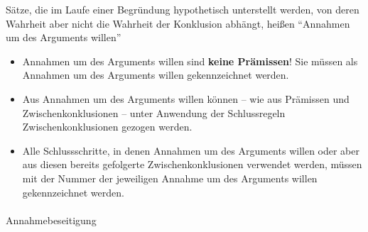 \documentclass[
  english,
  a4paper,
]{article}
\makeatletter
\let\oldparagraph\paragraph
\renewcommand{\paragraph}{
    \@ifstar
      \xxxParagraphStar
      \xxxParagraphNoStar
  }
\newcommand{\xxxParagraphStar}[1]{\oldparagraph*{#1}\mbox{}}
\newcommand{\xxxParagraphNoStar}[1]{\oldparagraph{#1}\mbox{}}
\providecommand{\tightlist}{%
  \setlength{\itemsep}{0pt}\setlength{\parskip}{0pt}}
\makeatother
\begin{document}
\begin{tcolorbox}[enhanced jigsaw, arc=.35mm, bottomrule=.15mm, bottomtitle=1mm, breakable, colback=white, colbacktitle=quarto-callout-note-color!10!white, colframe=quarto-callout-note-color-frame, coltitle=black, left=2mm, leftrule=.75mm, opacityback=0, opacitybacktitle=0.6, rightrule=.15mm, title=\textcolor{quarto-callout-note-color}{\faInfo}\hspace{0.5em}{Annahmen um des Arguments willen}, titlerule=0mm, toprule=.15mm, toptitle=1mm]

Sätze, die im Laufe einer Begründung hypothetisch unterstellt werden,
von deren Wahrheit aber nicht die Wahrheit der Konklusion abhängt,
heißen ``Annahmen um des Arguments willen''

\end{tcolorbox}

\begin{tcolorbox}[enhanced jigsaw, arc=.35mm, bottomrule=.15mm, bottomtitle=1mm, breakable, colback=white, colbacktitle=quarto-callout-important-color!10!white, colframe=quarto-callout-important-color-frame, coltitle=black, left=2mm, leftrule=.75mm, opacityback=0, opacitybacktitle=0.6, rightrule=.15mm, title=\textcolor{quarto-callout-important-color}{\faExclamation}\hspace{0.5em}{Important}, titlerule=0mm, toprule=.15mm, toptitle=1mm]

\begin{itemize}
\tightlist
\item
  Annahmen um des Arguments willen sind \textbf{keine Prämissen}! Sie
  müssen als Annahmen um des Arguments willen gekennzeichnet werden.
\item
  Aus Annahmen um des Arguments willen können -- wie aus Prämissen und
  Zwischenkonklusionen -- unter Anwendung der Schlussregeln
  Zwischenkonklusionen gezogen werden.
\item
  Alle Schlussschritte, in denen Annahmen um des Arguments willen oder
  aber aus diesen bereits gefolgerte Zwischenkonklusionen verwendet
  werden, müssen mit der Nummer der jeweiligen Annahme um des Arguments
  willen gekennzeichnet werden.
\end{itemize}

\end{tcolorbox}

\paragraph{Annahmebeseitigung}\label{annahmebeseitigung}
\end{document}
